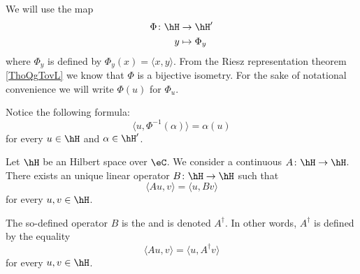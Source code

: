 We will use the map 
\begin{equation}
    \begin{aligned}
        \Phi\colon \hH&\to \hH' \\
        y&\mapsto \Phi_y 
    \end{aligned}
\end{equation}
where \( \Phi_y\) is defined by \( \Phi_y(x)=\langle x, y\rangle \). From the Riesz representation theorem \ref{ThoQgTovL} we know that \( \Phi\) is a bijective isometry. For the sake of notational convenience we will write \( \Phi(u)\) for \( \Phi_u\).

Notice the following formula:
\begin{equation}        \label{EQooHWQPooNeYokT}
    \langle u, \Phi^{-1}(\alpha)\rangle =\alpha(u)
\end{equation}
for every \( u\in \hH\) and \( \alpha\in\hH'\).

\begin{propositionDef}       \label{DEFooAAKCooZJCHPS}
    Let \( \hH\) be an Hilbert space over \( \eC\). We consider a continuous \( A\colon \hH\to \hH\). There exists an unique linear operator \( B\colon \hH\to \hH\) such that
    \begin{equation}
        \langle Au, v\rangle =\langle u, Bv\rangle 
    \end{equation}
    for every \( u,v\in \hH\).

    The so-defined operator \( B\) is the  and is denoted \( A^{\dag}\). In other words, \( A^{\dag}\) is defined by the equality
    \begin{equation}        \label{EQooPTUWooPCbNxA}
        \langle Au, v\rangle =\langle u, A^{\dag}v\rangle 
    \end{equation}
    for every \( u,v\in\hH\).
\end{propositionDef}

